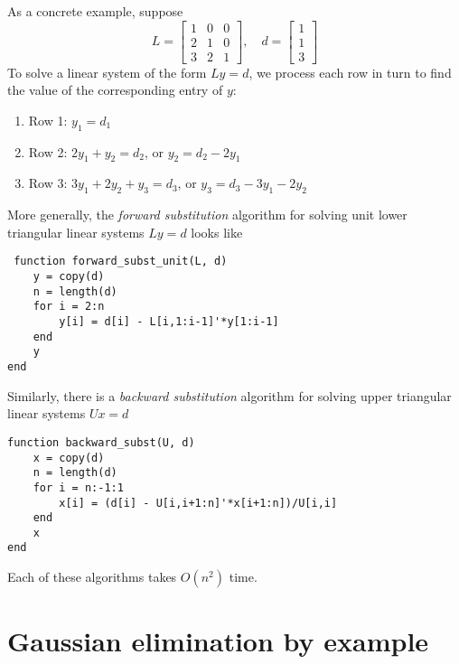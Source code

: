 \documentclass[12pt, leqno]{article}
\begin{document}
As a concrete example, suppose
\[
  L = \begin{bmatrix}
        1 & 0 & 0 \\
        2 & 1 & 0 \\
        3 & 2 & 1
      \end{bmatrix}, \quad
  d = \begin{bmatrix} 1 \\ 1 \\ 3 \end{bmatrix}
\]
To solve a linear system of the form $Ly = d$, we process each row in
turn to find the value of the corresponding entry of $y$:
\begin{enumerate}
\item Row 1:
  $y_1 = d_1$
\item Row 2: $2y_1 + y_2 = d_2$, or $y_2 = d_2 - 2y_1$
\item Row 3: $3y_1 + 2 y_2 + y_3 = d_3$, or $y_3 = d_3 - 3y_1 - 2y_2$
\end{enumerate}
More generally, the {\em forward substitution} algorithm for solving
unit lower triangular linear systems $Ly = d$ looks like
\begin{lstlisting}
 function forward_subst_unit(L, d)
	y = copy(d)
	n = length(d)
	for i = 2:n
		y[i] = d[i] - L[i,1:i-1]'*y[1:i-1]
	end
	y
end
\end{lstlisting}
Similarly, there is a {\em backward substitution} algorithm for
solving upper triangular linear systems $Ux = d$
\begin{lstlisting}
function backward_subst(U, d)
	x = copy(d)
	n = length(d)
	for i = n:-1:1
		x[i] = (d[i] - U[i,i+1:n]'*x[i+1:n])/U[i,i]
	end
	x
end  
\end{lstlisting}
Each of these algorithms takes $O(n^2)$ time.

\section{Gaussian elimination by example}
\end{document}
